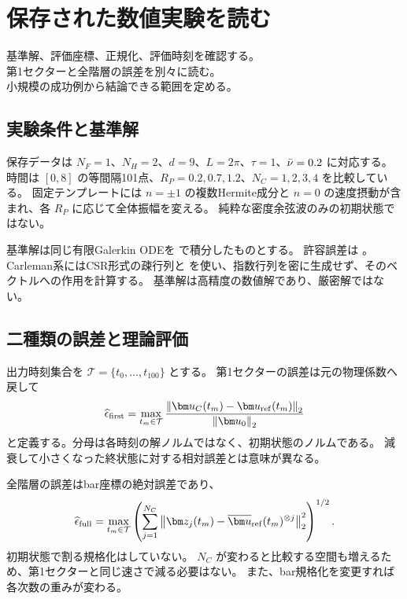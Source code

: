 \chapter{保存された数値実験を読む}
\begin{chaptergoal}
\cgitem 基準解、評価座標、正規化、評価時刻を確認する。\\
\cgitem 第1セクターと全階層の誤差を別々に読む。\\
\cgitem 小規模の成功例から結論できる範囲を定める。
\end{chaptergoal}

\section{実験条件と基準解}
保存データは $N_F=1$、$N_H=2$、$d=9$、$L=2\pi$、$\tau=1$、$\bar\nu=0.2$ に対応する。
時間は $[0,8]$ の等間隔101点、$R_P=0.2,0.7,1.2$、$N_C=1,2,3,4$ を比較している。
固定テンプレートには $n=\pm1$ の複数Hermite成分と $n=0$ の速度摂動が含まれ、各 $R_P$ に応じて全体振幅を変える。
純粋な密度余弦波のみの初期状態ではない。

基準解は同じ有限Galerkin ODEを  で積分したものとする。
許容誤差は 。
Carleman系にはCSR形式の疎行列と  を使い、指数行列を密に生成せず、そのベクトルへの作用を計算する。
基準解は高精度の数値解であり、厳密解ではない。

\section{二種類の誤差と理論評価}
出力時刻集合を $\mathcal T=\{t_0,\ldots,t_{100}\}$ とする。
第1セクターの誤差は元の物理係数へ戻して
\begin{equation}
\widehat\epsilon_{\mathrm{first}}=
\max_{t_m\in\mathcal T}
\frac{\normtwo{\uu_C(t_m)-\uu_{\mathrm{ref}}(t_m)}}{\normtwo{\uu_0}}
\label{eq:firsterror}
\end{equation}
と定義する。分母は各時刻の解ノルムではなく、初期状態のノルムである。
減衰して小さくなった終状態に対する相対誤差とは意味が異なる。

全階層の誤差はbar座標の絶対誤差であり、
\begin{equation}
\widehat\epsilon_{\mathrm{full}}=
\max_{t_m\in\mathcal T}
\left(\sum_{j=1}^{N_C}
\normtwo{\bm z_j(t_m)-\bu_{\mathrm{ref}}(t_m)^{\otimes j}}^2\right)^{1/2}.
\label{eq:fullerror}
\end{equation}
初期状態で割る規格化はしていない。
$N_C$ が変わると比較する空間も増えるため、第1セクターと同じ速さで減る必要はない。
また、bar規格化を変更すれば各次数の重みが変わる。

